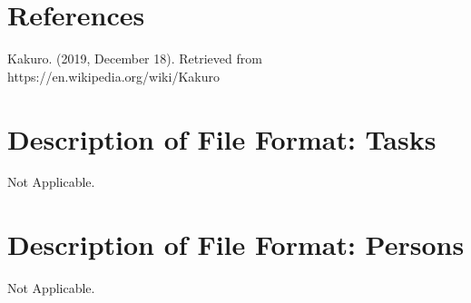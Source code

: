 \documentclass[12pt]{article}
\begin{document}
\clearpage

\section{References}

Kakuro. (2019, December 18). Retrieved from https://en.wikipedia.org/wiki/Kakuro
\clearpage
\appendix

\section{Description of File Format: Tasks}

Not Applicable.

\section{Description of File Format: Persons}

Not Applicable.
\end{document}
